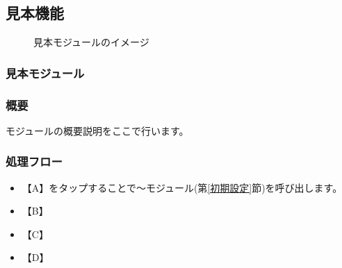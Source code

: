 \documentclass[a4j]{jarticle}
\begin{document}
\subsection{見本機能}
\begin{figure}[H]
    \begin{center}
    \caption {見本モジュールのイメージ}
    \label{functionselection}
    \end{center}
\end{figure}
\subsubsection{見本モジュール\label{見本}} %
\subsubsection*{概要}
モジュールの概要説明をここで行います。
\subsubsection*{処理フロー}
\begin{itemize}
\item 【A】をタップすることで～モジュール(第\ref{初期設定}節)を呼び出します。%
\item 【B】
\item 【C】
\item 【D】
\end{itemize}
\end{document}
